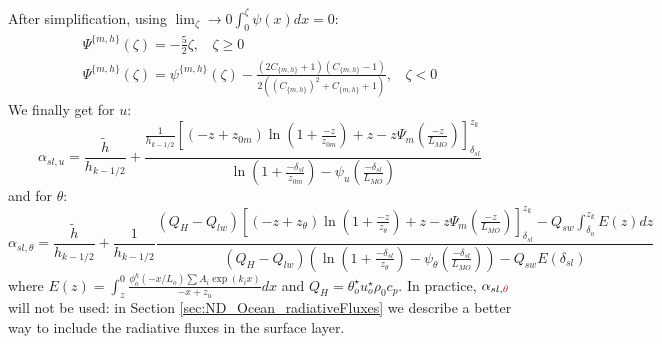 After simplification, using $\lim_\zeta\to0 \int_0^\zeta\psi(x)dx = 0$:
\begin{equation}
\begin{aligned}
\Psi^{\{m,h\}}(\zeta)= -\frac{5}{2}\zeta, ~~~~ \zeta \geq 0 \\
	\Psi^{\{m,h\}}(\zeta)=
	\psi^{\{m,h\}}(\zeta)
	- \frac{(2C_{\{m,h\}}+1)(C_{\{m,h\}} - 1)}
	{2\left((C_{\{m,h\}})^2 + C_{\{m,h\}} + 1\right)}, ~~~~ \zeta < 0
\end{aligned}
\end{equation}
We finally get for $u$:
\begin{equation}
	\alpha_{sl, u} = \frac{\widetilde{h}}{h_{k-1/2}} +
	\frac{\frac{1}{{h_{k-1/2}}}
    \left[
	    (-z+z_{0m})\ln(1+\frac{-z}{z_{0m}})+z
    -
    z \Psi_m(\frac{-z}{L_{MO}}) \right]_{\delta_{sl}}^{z_k}
    }{\ln(1+\frac{-\delta_{sl}}{z_{0m}})- \psi_u(\frac{-\delta_{sl}}{L_{MO}})
    }
\end{equation}
and for $\theta$:
\begin{equation}
	\alpha_{sl, \theta} =  \frac{\widetilde{h}}{h_{k-1/2}} +
	\frac{1}{{h_{k-1/2}}}\frac{(Q_H -
		Q_{lw})
    \left[
	    (-z+z_{\theta})\ln(1+\frac{-z}{z_{\theta}})+z
    -
    z \Psi_m(\frac{-z}{L_{MO}}) \right]_{\delta_{sl}}^{z_k}
	- Q_{sw} \int_{\delta_o}^{z_k}
		E(z) dz
    }{(Q_H - Q_{lw})
	    \left(\ln(1+\frac{-\delta_{sl}}{z_{\theta}})-
	    \psi_\theta(\frac{-\delta_{sl}}{L_{MO}})\right)
	    -Q_{sw} E(\delta_{sl})
    }
\end{equation}
where $E(z) = \int_{z}^0 \frac{\phi^h_o(-x/L_o)
		\sum A_i \exp (k_i x)
		}{-x + z_{u}}dx$
and $Q_H = \theta_o^{\star}u_o^{\star}\rho_0 c_p$.
In practice, $\alpha_{sl, \emphase{\theta}}$ will not be used: in Section
\ref{sec:ND_Ocean_radiativeFluxes} we describe a better way to
include the radiative fluxes in the surface layer.
